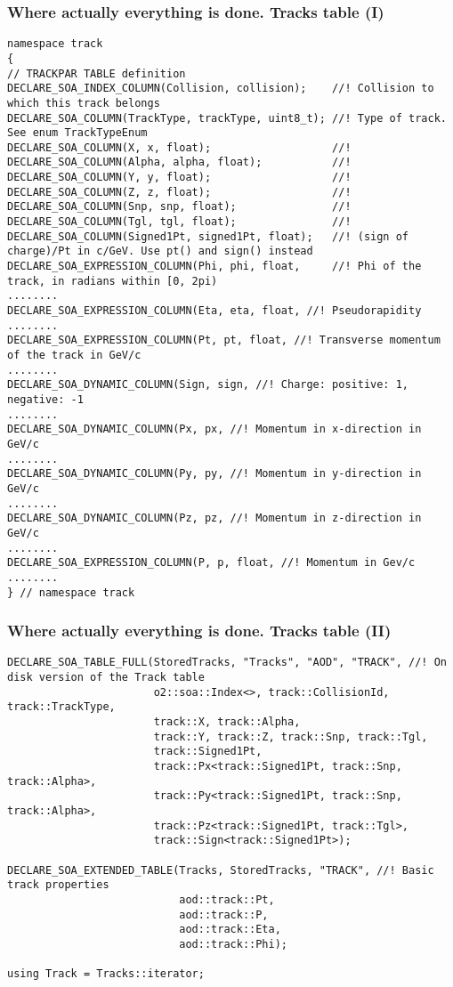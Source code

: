 \documentclass[14pt,aspectratio=169,t]{beamer}
\begin{document}
\begin{frame}[fragile]
  \frametitle{Where actually everything is done. Tracks table (I)}
  \vspace{-0.05in}
  {\tiny\color{red}
  \begin{verbatim}
namespace track
{
// TRACKPAR TABLE definition
DECLARE_SOA_INDEX_COLUMN(Collision, collision);    //! Collision to which this track belongs
DECLARE_SOA_COLUMN(TrackType, trackType, uint8_t); //! Type of track. See enum TrackTypeEnum
DECLARE_SOA_COLUMN(X, x, float);                   //!
DECLARE_SOA_COLUMN(Alpha, alpha, float);           //!
DECLARE_SOA_COLUMN(Y, y, float);                   //!
DECLARE_SOA_COLUMN(Z, z, float);                   //!
DECLARE_SOA_COLUMN(Snp, snp, float);               //!
DECLARE_SOA_COLUMN(Tgl, tgl, float);               //!
DECLARE_SOA_COLUMN(Signed1Pt, signed1Pt, float);   //! (sign of charge)/Pt in c/GeV. Use pt() and sign() instead
DECLARE_SOA_EXPRESSION_COLUMN(Phi, phi, float,     //! Phi of the track, in radians within [0, 2pi)
........
DECLARE_SOA_EXPRESSION_COLUMN(Eta, eta, float, //! Pseudorapidity
........
DECLARE_SOA_EXPRESSION_COLUMN(Pt, pt, float, //! Transverse momentum of the track in GeV/c
........
DECLARE_SOA_DYNAMIC_COLUMN(Sign, sign, //! Charge: positive: 1, negative: -1
........
DECLARE_SOA_DYNAMIC_COLUMN(Px, px, //! Momentum in x-direction in GeV/c
........
DECLARE_SOA_DYNAMIC_COLUMN(Py, py, //! Momentum in y-direction in GeV/c
........
DECLARE_SOA_DYNAMIC_COLUMN(Pz, pz, //! Momentum in z-direction in GeV/c
........
DECLARE_SOA_EXPRESSION_COLUMN(P, p, float, //! Momentum in Gev/c
........
} // namespace track

  \end{verbatim}}
\end{frame}


\begin{frame}[fragile]
  \frametitle{Where actually everything is done. Tracks table (II)}
  {\tiny\color{red}
  \begin{verbatim}
DECLARE_SOA_TABLE_FULL(StoredTracks, "Tracks", "AOD", "TRACK", //! On disk version of the Track table
                       o2::soa::Index<>, track::CollisionId, track::TrackType,
                       track::X, track::Alpha,
                       track::Y, track::Z, track::Snp, track::Tgl,
                       track::Signed1Pt,
                       track::Px<track::Signed1Pt, track::Snp, track::Alpha>,
                       track::Py<track::Signed1Pt, track::Snp, track::Alpha>,
                       track::Pz<track::Signed1Pt, track::Tgl>,
                       track::Sign<track::Signed1Pt>);

DECLARE_SOA_EXTENDED_TABLE(Tracks, StoredTracks, "TRACK", //! Basic track properties
                           aod::track::Pt,
                           aod::track::P,
                           aod::track::Eta,
                           aod::track::Phi);

using Track = Tracks::iterator;
  \end{verbatim}}
\end{frame}
\end{document}
